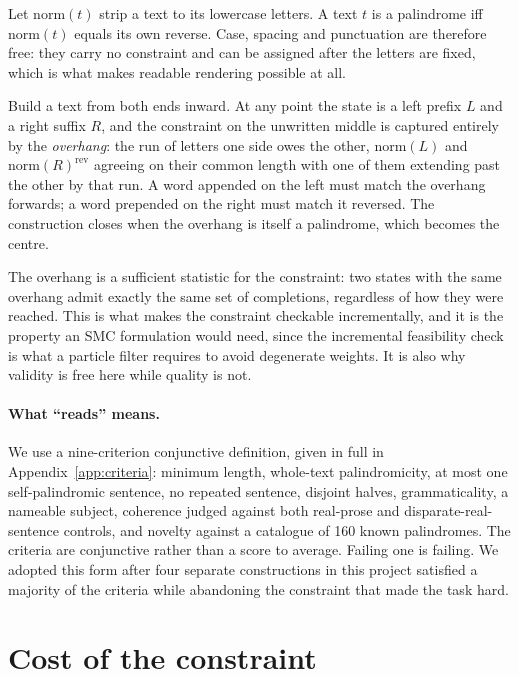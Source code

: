 \documentclass[11pt]{article}
\begin{document}
Let $\mathrm{norm}(t)$ strip a text to its lowercase letters. A text $t$ is a
palindrome iff $\mathrm{norm}(t)$ equals its own reverse. Case, spacing and
punctuation are therefore free: they carry no constraint and can be assigned
after the letters are fixed, which is what makes readable rendering possible at
all.

Build a text from both ends inward. At any point the state is a left prefix
$L$ and a right suffix $R$, and the constraint on the unwritten middle is
captured entirely by the \emph{overhang}: the run of letters one side owes the
other, $\mathrm{norm}(L)$ and $\mathrm{norm}(R)^{\mathrm{rev}}$ agreeing on
their common length with one of them extending past the other by that run. A
word appended on the left must match the overhang forwards; a word prepended on
the right must match it reversed. The construction closes when the overhang is
itself a palindrome, which becomes the centre.

The overhang is a sufficient statistic for the constraint: two states with the
same overhang admit exactly the same set of completions, regardless of how they
were reached. This is what makes the constraint checkable incrementally, and it
is the property an SMC formulation would need, since the incremental
feasibility check is what a particle filter requires to avoid degenerate
weights. It is also why validity is free here while quality is not.

\paragraph{What ``reads'' means.}
We use a nine-criterion conjunctive definition, given in full in
Appendix~\ref{app:criteria}: minimum length, whole-text palindromicity, at most
one self-palindromic sentence, no repeated sentence, disjoint halves,
grammaticality, a nameable subject, coherence judged against both real-prose
and disparate-real-sentence controls, and novelty against a catalogue of 160
known palindromes. The criteria are conjunctive rather than a score to average.
Failing one is failing. We adopted this form after four separate constructions
in this project satisfied a majority of the criteria while abandoning the
constraint that made the task hard.

\section{Cost of the constraint}
\label{sec:cost}
\end{document}
